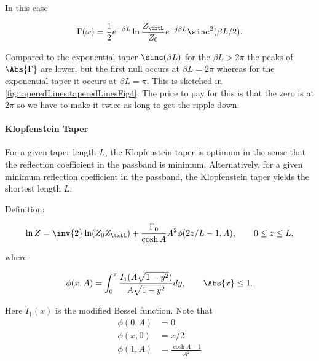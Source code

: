 In this case

\begin{dmath}\label{eqn:continuumAndOtherTransformersCore:1000}
\Gamma(\omega) = \frac{1}{2} e^{-\beta L} \ln \frac{Z_\txtL}{Z_0} e^{-j \beta L} \sinc^2( \beta L/2 ).
\end{dmath}

Compared to the exponential taper \( \sinc( \beta L ) \) for the \( \beta L > 2 \pi \) the peaks of \( \Abs{\Gamma} \) are lower, but the first null occurs at \( \beta L = 2 \pi \) whereas for the exponential taper it occurs at \( \beta L = \pi \).  This is sketched in \cref{fig:taperedLines:taperedLinesFig4}.  The price to pay for this is that the zero is at \( 2 \pi \) so we have to make it twice as long to get the ripple down.


\paragraph{Klopfenstein Taper}

For a given taper length \( L \), the Klopfenstein taper is optimum in the sense that the reflection coefficient in the passband is minimum.  Alternatively, for a given minimum reflection coefficient in the passband, the Klopfenstein taper yields the shortest length \( L \).

Definition:

\begin{equation}\label{eqn:continuumAndOtherTransformersCore:1020}
\ln Z = \inv{2} \ln (Z_0 Z_\txtL) + \frac{\Gamma_0}{\cosh A} A^2 \phi(2 z/L -1, A), \qquad 0 \le z \le L,
\end{equation}

where

\begin{equation}\label{eqn:continuumAndOtherTransformersCore:1040}
\phi(x, A) = \int_0^x \frac{I_1(A\sqrt{1 - y^2})}{A \sqrt{1 - y^2}} dy, \qquad \Abs{x} \le 1.
\end{equation}

Here \( I_1(x) \) is the modified Bessel function.  Note that
\begin{equation}\label{eqn:continuumAndOtherTransformersCore:1060}
\begin{aligned}
\phi(0, A) &= 0 \\
\phi(x, 0) &= x/2 \\
\phi(1, A) &= \frac{\cosh A - 1}{A^2}
\end{aligned}
\end{equation}

